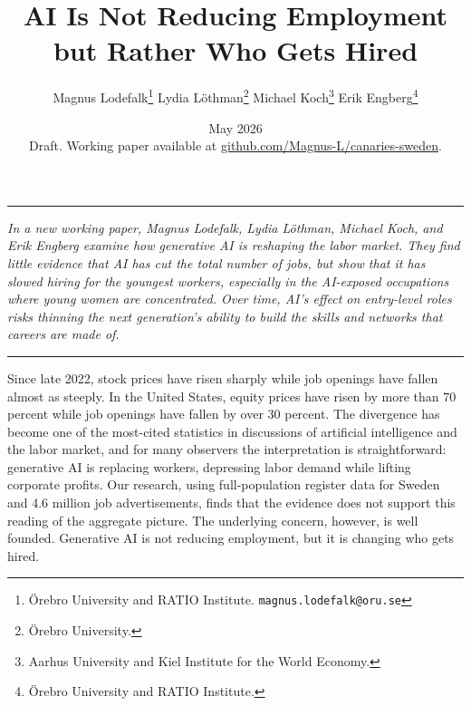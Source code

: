 \documentclass[12pt]{article}
\begin{document}

\title{\textbf{AI Is Not Reducing Employment but Rather Who Gets Hired}}

\author{
  Magnus Lodefalk\thanks{Örebro University and RATIO Institute.
  \texttt{magnus.lodefalk@oru.se}} \quad
  Lydia Löthman\thanks{Örebro University.} \quad
  Michael Koch\thanks{Aarhus University and Kiel Institute for the World Economy.} \quad
  Erik Engberg\thanks{Örebro University and RATIO Institute.}
}

\date{May 2026 \\ \medskip
\small Draft. Working paper available at
\href{https://github.com/Magnus-L/canaries-sweden/blob/main/paper/main.pdf}{github.com/Magnus-L/canaries-sweden}.}

\maketitle
\thispagestyle{empty}

\bigskip
\noindent\rule{\textwidth}{0.4pt}
\bigskip


\noindent\textit{In a new working paper, Magnus Lodefalk, Lydia Löthman, Michael Koch, and Erik Engberg
examine how generative AI is reshaping the labor market. They find little evidence that AI has cut
the total number of jobs, but show that it has slowed hiring for the youngest workers, especially in
the AI-exposed occupations where young women are concentrated. Over time, AI's effect on entry-level
roles risks thinning the next generation's ability to build the skills and networks that careers are
made of.}

\bigskip
\noindent\rule{\textwidth}{0.4pt}
\bigskip


Since late 2022, stock prices have risen sharply while job openings have fallen almost as steeply.
In the United States, equity prices have risen by more than 70 percent while job openings have fallen
by over 30 percent. The divergence has become one of the most-cited statistics in discussions of
artificial intelligence and the labor market, and for many observers the interpretation is
straightforward: generative AI is replacing workers, depressing labor demand while lifting corporate
profits. Our research, using full-population register data for Sweden and 4.6 million job
advertisements, finds that the evidence does not support this reading of the aggregate picture. The
underlying concern, however, is well founded. Generative AI is not reducing employment, but it is
changing who gets hired.
\end{document}
